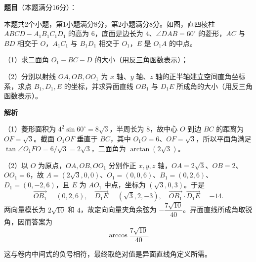 \begin{answer}

\textbf{题目}（本题满分16分）：

本题共2个小题，第1小题满分8分，第2小题满分8分。如图，直四棱柱 $ABCD-A_1B_1C_1D_1$ 的高为 $6$，底面是边长为 $4$、$\angle DAB=60^\circ$ 的菱形，$AC$ 与 $BD$ 相交于 $O$，$A_1C_1$ 与 $B_1D_1$ 相交于 $O_1$，$E$ 是 $O_1A$ 的中点。

（1）求二面角 $O_1-BC-D$ 的大小（用反三角函数表示）；

（2）分别以射线 $OA,OB,OO_1$ 为 $x$ 轴、$y$ 轴、$z$ 轴的正半轴建立空间直角坐标系，求点 $B_1,D_1,E$ 的坐标，并求异面直线 $OB_1$ 与 $D_1E$ 所成角的大小（用反三角函数表示）。
\nopagebreak[4]
\begin{center}\end{center}
\nopagebreak[4]
\textbf{解析}

（1）菱形面积为 $4^2\sin60^\circ=8\sqrt3$，半周长为 $8$，故中心 $O$ 到边 $BC$ 的距离为 $OF=\sqrt3$。截面 $O_1OF$ 垂直于 $BC$，其中 $O_1O=6$、$OF=\sqrt3$，所以平面角满足 $\tan\angle O_1FO=6/\sqrt3=2\sqrt3$，二面角为 $\arctan(2\sqrt3)$。

（2）以 $O$ 为原点，$OA,OB,OO_1$ 分别作正 $x,y,z$ 轴，$OA=2\sqrt3$、$OB=2$、$OO_1=6$，故 $A=(2\sqrt3,0,0)$、$O_1=(0,0,6)$、$B_1=(0,2,6)$、$D_1=(0,-2,6)$，且 $E$ 为 $AO_1$ 中点，坐标为 $(\sqrt3,0,3)$。于是
\nopagebreak[4]
\[
\overrightarrow{OB_1}=(0,2,6),\quad \overrightarrow{D_1E}=(\sqrt3,2,-3),\quad
\overrightarrow{OB_1}\cdot\overrightarrow{D_1E}=-14.
\]
两向量模长为 $2\sqrt{10}$ 和 $4$，故定向向量夹角余弦为 $-\dfrac{7\sqrt{10}}{40}$。异面直线所成角取锐角，因而答案为
\nopagebreak[4]
\[
\arccos\frac{7\sqrt{10}}{40}.
\]

这与卷内中间式的负号相符，最终取绝对值是异面直线角定义所需。


\end{answer}
